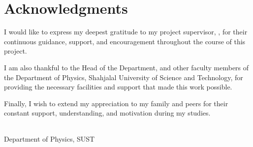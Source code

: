 
\chapter*{Acknowledgments}

I would like to express my deepest gratitude to my project supervisor, \textbf{\printsupervisor}, for their continuous guidance, support, and encouragement throughout the course of this project.

I am also thankful to the Head of the Department, and other faculty members of the Department of Physics, Shahjalal University of Science and Technology, for providing the necessary facilities and support that made this work possible.

Finally, I wish to extend my appreciation to my family and peers for their constant support, understanding, and motivation during my studies.

\vspace{0.8in}
\noindent
\printauthor \\
Department of Physics, SUST
